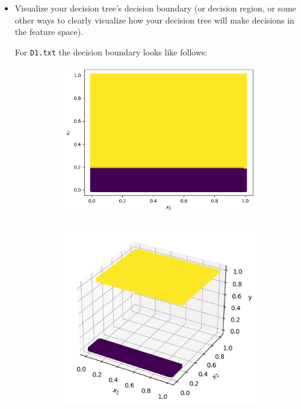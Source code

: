 \documentclass[a4paper]{article}
\theoremstyle{definition}
\newenvironment{soln}{
    \leavevmode\color{blue}\ignorespaces
}{}
\begin{document}
\begin{enumerate}
\begin{itemize}
\begin{soln}
    \end{soln}
  \item Visualize your decision tree's decision boundary (or decision region, or some other ways to clearly visualize how your decision tree will make decisions in the feature space).\\
  \begin{soln}
      For \texttt{D1.txt} the decision boundary looks like follows:
        \begin{figure}[H]
            \begin{subfigure}{0.5\textwidth}
                \centering
                \includegraphics[scale=0.3]{Images/Q6/DTq6d1_bound.png}
            \end{subfigure}%
            \begin{subfigure}{0.5\textwidth}
                \centering
                \includegraphics[scale=0.3]{Images/Q6/DTq6d1_bound_3d.png}

\end{subfigure}
\end{figure}
\end{soln}
\end{itemize}
\end{enumerate}
\end{document}
